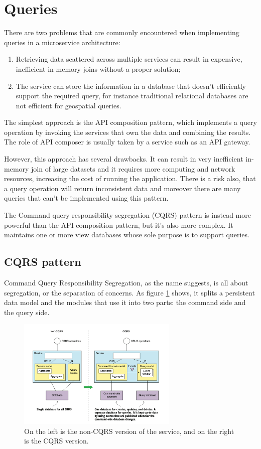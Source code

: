 \documentclass[conference]{IEEEtran}
\begin{document}
\section{Queries}

There are two problems that are commonly encountered when implementing queries in a microservice architecture:

\begin{enumerate}
  \item Retrieving data scattered across multiple services can result in expensive, inefficient in-memory joins without a proper solution;
  \item The service can store the information in a database that doesn’t efficiently support the required query, for instance traditional relational databases are not efficient for geospatial queries.
\end{enumerate}

The simplest approach is the API composition pattern, which implements a query operation by invoking the services that own the data and combining the results. The role of API composer is usually taken by a service such as an API gateway.

However, this approach has several drawbacks. It can result in very inefficient in-memory join of large datasets and it requires more computing and network resources, increasing the cost of running the application. There is a risk also, that a query operation will return inconsistent data and moreover there are many queries that can't be implemented using this pattern. \cite{microservices-patterns-api-composition}

The Command query responsibility segregation (CQRS) pattern is instead more powerful than the API composition pattern, but it's also more complex. It maintains one or more view databases whose sole purpose is to support queries.

\subsection{CQRS pattern}

Command Query Responsibility Segregation, as the name suggests, is all about segregation, or the separation of concerns. As figure \ref{cqrs} shows, it splits a persistent data model and the modules that use it into two parts: the command side and the query side.

\begin{figure}[!htbp]
\centering
\includegraphics[width=3in]{jpeg/cqrs}
\caption{On the left is the non-CQRS version of the service, and on the right is the CQRS version. \cite{microservices-patterns-cqrs}}
\label{cqrs}
\end{figure}
\end{document}
